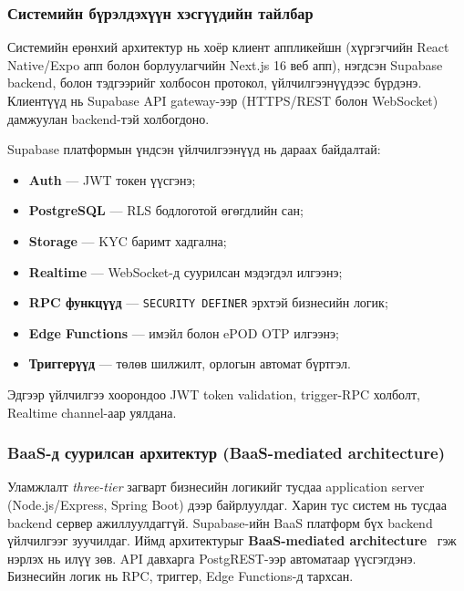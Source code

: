 \subsubsection{Системийн бүрэлдэхүүн хэсгүүдийн тайлбар}

Системийн ерөнхий архитектур нь хоёр клиент аппликейшн (хүргэгчийн React Native/Expo апп болон борлуулагчийн Next.js 16 веб апп), нэгдсэн Supabase backend, болон тэдгээрийг холбосон протокол, үйлчилгээнүүдээс бүрдэнэ. Клиентүүд нь Supabase API gateway-ээр (HTTPS/REST болон WebSocket) дамжуулан backend-тэй холбогдоно.

Supabase платформын үндсэн үйлчилгээнүүд нь дараах байдалтай:
\begin{itemize}
  \item \textbf{Auth} — JWT токен үүсгэнэ;
  \item \textbf{PostgreSQL} — RLS бодлоготой өгөгдлийн сан;
  \item \textbf{Storage} — KYC баримт хадгална;
  \item \textbf{Realtime} — WebSocket-д суурилсан мэдэгдэл илгээнэ;
  \item \textbf{RPC функцүүд} — \texttt{SECURITY DEFINER} эрхтэй бизнесийн логик;
  \item \textbf{Edge Functions} — имэйл болон ePOD OTP илгээнэ;
  \item \textbf{Триггерүүд} — төлөв шилжилт, орлогын автомат бүртгэл.
\end{itemize}
Эдгээр үйлчилгээ хоорондоо JWT token validation, trigger-RPC холболт, Realtime channel-аар уялдана.

\subsubsection{BaaS-д суурилсан архитектур (BaaS-mediated architecture)}
\label{subsubsec:baas_architecture}

Уламжлалт \textit{three-tier} загварт бизнесийн логикийг тусдаа application server (Node.js/Express, Spring Boot) дээр байрлуулдаг. Харин тус систем нь тусдаа backend сервер ажиллуулдаггүй. Supabase-ийн BaaS платформ бүх backend үйлчилгээг зуучилдаг. Иймд архитектурыг \textbf{BaaS-mediated architecture}~\cite{jonas2019berkeleyserverless} гэж нэрлэх нь илүү зөв. API давхарга PostgREST-ээр автоматаар үүсгэгдэнэ. Бизнесийн логик нь RPC, триггер, Edge Functions-д тархсан.

